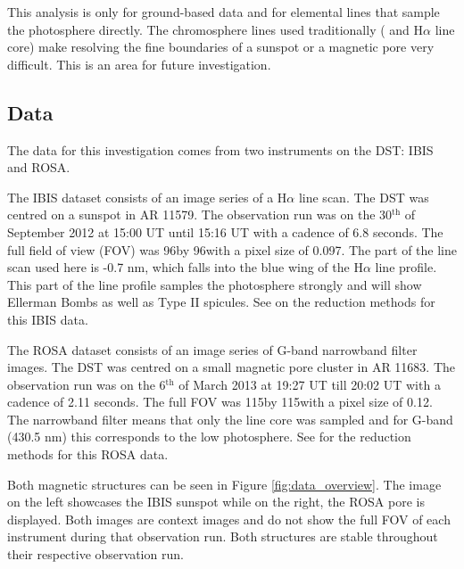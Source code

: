 	This analysis is only for ground-based data and for elemental lines that sample the photosphere directly.
	The chromosphere lines used traditionally ( and H$\alpha$ line core) make resolving the fine boundaries of a sunspot or a magnetic pore very difficult.
    This is an area for future investigation.
    
    \subsection{Data}
    
    The data for this investigation comes from two instruments on the DST: IBIS and ROSA.
    
    The IBIS dataset consists of an image series of a H$\alpha$ line scan.
    The DST was centred on a sunspot in AR 11579.
    The observation run was on the 30$^{\mathrm{th}}$ of September 2012 at 15:00 UT until 15:16 UT with a cadence of 6.8 seconds.
    The full field of view (FOV) was 96\arcsecs by 96\arcsecs with a pixel size of 0.097\arcsecs.
    The part of the line scan used here is -0.7 nm, which falls into the blue wing of the H$\alpha$ line profile.
    This part of the line profile samples the photosphere strongly and will show Ellerman Bombs as well as Type II spicules.
    See \cite{2013A&A...560A..31N} on the reduction methods for this IBIS data.

    The ROSA dataset consists of an image series of G-band narrowband filter images.
    The DST was centred on a small magnetic pore cluster in AR 11683.
    The observation run was on the 6$^{\mathrm{th}}$ of March 2013 at 19:27 UT till 20:02 UT with a cadence of 2.11 seconds.
    The full FOV was 115\arcsecs by 115\arcsecs with a pixel size of 0.12\arcsecs.
    The narrowband filter means that only the line core was sampled and for G-band (430.5 nm) this corresponds to the low photosphere.
    See \cite{0004-637X-806-1-132} for the reduction methods for this ROSA data.
    
    Both magnetic structures can be seen in Figure \ref{fig:data_overview}.
    The image on the left showcases the  IBIS sunspot while on the right, the ROSA pore is displayed.
    Both images are context images and do not show the full FOV of each instrument during that observation run.
    Both structures are stable throughout their respective observation run.

